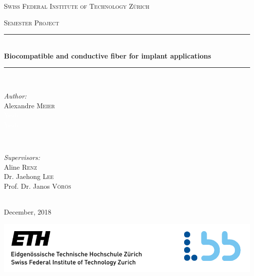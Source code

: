 \documentclass[12pt]{article}
\begin{document}
\begin{titlepage}

\newcommand{\HRule}{\rule{\linewidth}{0.5mm}} %

\center %
 
{\textsc{\LARGE Swiss Federal Institute of Technology Zürich  }\\[1cm]
}

\textsc{\Large Semester Project}\\[0.8cm] %


\HRule \\[0.4cm]
{  {\huge \bfseries Biocompatible and conductive fiber for implant applications}}\\[0.4cm] %

\HRule \\[1.5cm]
 


\begin{minipage}{0.4\textwidth}
\begin{flushleft} \large
\emph{Author:}\\
Alexandre \textsc{Meier}\\
\textcolor{white}{Yeah}\\
\textcolor{white}{Yeah}
\end{flushleft}
\end{minipage}
~
\begin{minipage}{0.5\textwidth}
\begin{flushright} \large
\emph{Supervisors:} \\
Aline \textsc{Renz}\\
Dr. Jaehong \textsc{Lee}\\
Prof. Dr. Janos \textsc{Vörös}
\end{flushright}
\end{minipage}\\[2cm]



{\large December, 2018}\\[2cm] 


\centerline{\includegraphics[scale=0.9]{./pic/ETH_LBB.PNG}}

\vfill 

\end{titlepage}
\


\newpage
\tableofcontents
\newpage






\clearpage


\newpage

  
  
\end{document}
